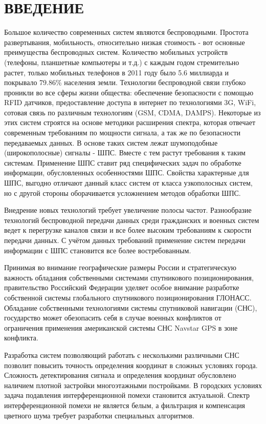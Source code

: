 \section*{ВВЕДЕНИЕ}

Большое количество современных систем являются беспроводными. Простота развертывания, мобильность, относительно низкая
стоимость - вот основные преимущества беспроводных систем. Количество мобильных устройств (телефоны, планшетные компьютеры
и т.д.) с каждым годом стремительно растет, только мобильных телефонов в 2011 году было 5.6 миллиарда и покрывало 79.86\%
\cite{wiki_mobilenum} населения земли. Технологии беспроводной связи глубоко проникли во все сферы жизни общества:
обеспечение безопасности с помощью RFID датчиков, предоставление доступа в интернет по технологиями 3G, WiFi, 
сотовая связь по различным технологиям (GSM, CDMA, DAMPS). Некоторые из этих систем строятся на основе методики
расширения спектра, которая отвечает современным требованиям по мощности сигнала, а так же по безопасности передаваемых
данных. В основе таких систем лежат шумоподобные (широкополосные) сигналы - ШПС. Вместе с тем растут требования к таким
системам. Применение ШПС ставит ряд специфических задач по обработке информации, обусловленных особенностями ШПС.
Свойства характерные для ШПС, выгодно отличают данный класс систем от класса узкополосных систем, но с другой стороны
оборачивается усложнением методов обработки ШПС.

Внедрение новых технологий требует увеличение полосы частот. Разнообразие технологий беспроводной передачи данных среди
гражданских и военных систем ведет к перегрузке каналов связи и все более высоким требованиям к скорости передачи
данных. С учётом данных требований применение систем передачи информации с ШПС становится все более востребованным.

Принимая во внимание географические размеры России и стратегическую важность обладания собственными системами спутникового
позиционирования, правительство Российский Федерации уделяет особое внимание разработке собственной системы
глобального спутникового позиционирования ГЛОНАСС. Обладание собственными технологиями системы спутниковой навигации (СНС), государство может обезопасить
себя в случае военных конфликтов от ограничения применения американской системы СНС Navstar GPS в зоне конфликта.

Разработка систем позволяющий работать с несколькими различными СНС позволит повысить точность определения координат
в сложных условиях города. Сложность детектирования сигнала и определения координат обусловлено наличием плотной
застройки многоэтажными постройками. В городских условиях задача подавления интерференционной помехи становится
актуальной. Спектр интерференционной помехи не является белым, а фильтрация и компенсация цветного шума
требует разработки специальных алгоритмов.

